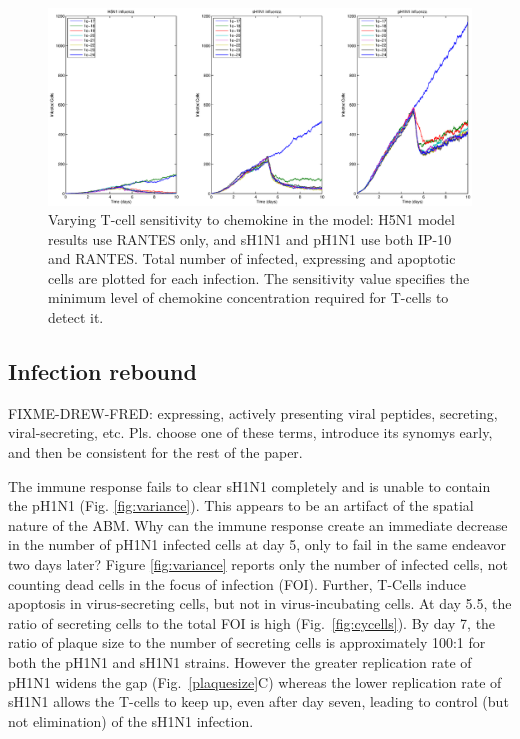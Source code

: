 \documentclass[10pt]{article}
\begin{document}
\begin{figure}[ht!]
\begin{center}
 \includegraphics[width=\textwidth]{sensitivity}
 \end{center}
\caption{Varying T-cell sensitivity to chemokine in the model: H5N1 model results use RANTES  only, and sH1N1 and pH1N1 use both IP-10 and RANTES. Total number of infected, expressing and apoptotic cells are plotted for each infection.  The sensitivity value specifies the minimum level of chemokine concentration required for T-cells to detect it. } 
 \label{fig:sensitivity}
\end{figure}

\subsection*{Infection rebound}

FIXME-DREW-FRED: expressing, actively presenting viral peptides, secreting, viral-secreting, etc.  Pls. choose one of these terms, introduce its synomys early, and then
be consistent for the rest of the paper.

The immune response fails to clear sH1N1 completely and is unable to contain the pH1N1 (Fig. \ref{fig:variance}).  This appears to be an artifact of the spatial nature of the ABM.  Why can the immune response create an immediate decrease in the number of pH1N1 infected cells at day 5, only to fail in the same endeavor two days later?   Figure \ref{fig:variance} reports only the number of infected cells, not counting dead cells in the focus of infection (FOI).  Further, T-Cells induce apoptosis in virus-secreting cells, but not in virus-incubating cells.  At day 5.5, the ratio of secreting cells to the total FOI is high (Fig.~\ref{fig:cycells}). By day 7, the ratio of plaque size to the number of secreting cells is approximately 100:1 for both the pH1N1 and sH1N1 strains.  However the greater replication rate of pH1N1 widens the gap (Fig.~\ref{plaquesize}C) whereas the lower replication rate of sH1N1 allows the T-cells to keep up, even after day seven, leading to control (but not elimination) of the sH1N1 infection.
\end{document}
